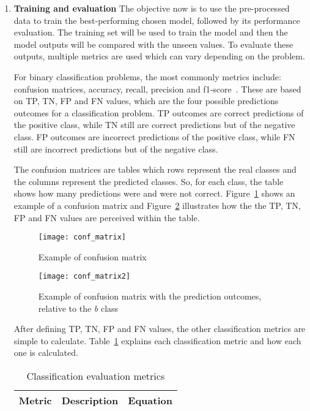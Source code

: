 \begin{enumerate}
    \item \textbf{Training and evaluation} The objective now is to use the pre-processed data to train the best-performing chosen model, followed by its performance evaluation. 
    The training set will be used to train the model and then the model outputs will be compared with the unseen values. To evaluate these outputs, multiple metrics are used which can vary depending on the problem. 
    
    For binary classification problems, the most commonly metrics include: confusion matrices, accuracy, recall, precision and f1-score~\cite{Liu2014AEvaluation}. These are based on \gls{TP}, \gls{TN}, \gls{FP} and \gls{FN} values, which are the four possible predictions outcomes for a classification problem. \gls{TP} outcomes are correct predictions of the positive class, while \gls{TN} still are correct predictions but of the negative class. \gls{FP} outcomes are incorrect predictions of the positive class, while \gls{FN} still are incorrect predictions but of the negative class. 
    
    The confusion matrices are tables which rows represent the real classes and the columns represent the predicted classes. So, for each class, the table shows how many predictions were and were not correct. Figure~\ref{fig:conf_matrix} shows an example of a confusion matrix and Figure~\ref{fig:conf_matrix2} illustrates how the the \gls{TP}, \gls{TN}, \gls{FP} and \gls{FN} values are perceived within the table.
    
    \begin{figure}[htbp]
        \centering
        \texttt{[image: conf\_matrix]}
        \caption{Example of confusion matrix}
        \label{fig:conf_matrix}
    \end{figure}
    
    \begin{figure}[htbp]
        \centering
        \texttt{[image: conf\_matrix2]}
        \caption{Example of confusion matrix with the prediction outcomes, relative to the \textit{b} class}
        \label{fig:conf_matrix2}
    \end{figure}
    
    After defining \gls{TP}, \gls{TN}, \gls{FP} and \gls{FN} values, the other classification metrics are simple to calculate. Table~\ref{tab:classification_metrics} explains each classification metric and how each one is calculated.
    
    \begin{table}[ht]
    	\caption{Classification evaluation metrics}
        \label{tab:classification_metrics}
    \centering
    \begin{tabular}{p{2.5cm}cc}
    	\toprule
    	\multicolumn{1}{c}{\textbf{Metric}} & \textbf{Description} & \textbf{Equation} \\
    	\midrule
    	

\end{tabular}
\end{table}
\end{enumerate}
